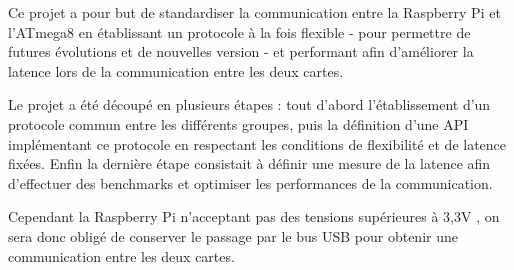 Ce projet a pour but de standardiser la communication entre la Raspberry Pi et
l'ATmega8 en établissant un protocole à la fois flexible - pour permettre de
futures évolutions et de nouvelles version - et performant afin d'améliorer la
latence lors de la communication entre les deux cartes.

Le projet a été découpé en plusieurs étapes : tout d'abord l'établissement
d'un protocole commun entre les différents groupes, puis la définition d'une
API implémentant ce protocole en respectant les conditions de flexibilité et
de latence fixées. Enfin la dernière étape consistait à définir une mesure de
la latence afin d'effectuer des benchmarks et optimiser les performances de la
communication.

Cependant la Raspberry Pi n'acceptant pas des tensions supérieures à 3,3V , on
sera donc obligé de conserver le passage par le bus USB pour obtenir une
communication entre les deux cartes.
